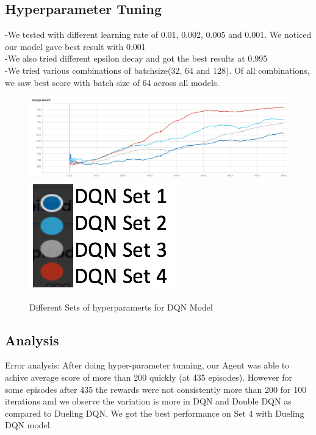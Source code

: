 \subsection{ Hyperparameter  Tuning}
-We tested with different learning rate of 0.01, 0.002, 0.005 and 0.001. We noticed our model gave best result with 0.001\\
-We also tried different epsilon decay and got the best results at 0.995\\
-We tried various combinations of batchsize(32, 64 and 128). Of all combinations, we saw best score with batch size of 64 across all models. \\

\begin{figure}[!ht]
\centering
\includegraphics[scale=0.75,width=0.75\columnwidth]{figures/Hyperparameters1.png}%
\includegraphics[scale=0.15,width=0.15\columnwidth]{figures/Hyperparameters_legends1.png}%
\caption{ Different Sets of hyperparamerts for DQN Model}%
\label{fig:Visualization}%
\end{figure}



\subsection{ Analysis}
Error analysis: After doing hyper-parameter tunning, our Agent was able to achive average score of more than 200 quickly (at 435 episodes). 
However for some episodes after 435 the rewards were not consistently more than 200 for 100 iterations and we observe the variation is more in DQN and Double DQN as compared to Dueling DQN. We got the best performance on Set 4 with Dueling DQN model.

